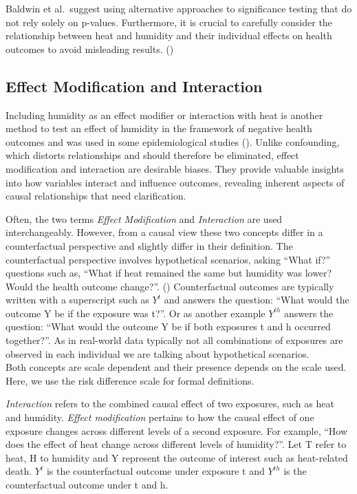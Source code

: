 \documentclass[
]{krantz}
\begin{document}
Baldwin et al.~suggest using alternative approaches to significance testing that do not rely solely on p-values. Furthermore, it is crucial to carefully consider the relationship between heat and humidity and their individual effects on health outcomes to avoid misleading results. (\citet{baldwin2023})

\subsection{Effect Modification and Interaction}\label{effect-modification-and-interaction}

Including humidity as an effect modifier or interaction with heat is another method to test an effect of humidity in the framework of negative health outcomes and was used in some epidemiological studies (\citet{baldwin2023}). Unlike confounding, which distorts relationships and should therefore be eliminated, effect modification and interaction are desirable biases. They provide valuable insights into how variables interact and influence outcomes, revealing inherent aspects of causal relationships that need clarification.

Often, the two terms \emph{Effect Modification} and \emph{Interaction} are used interchangeably. However, from a causal view these two concepts differ in a counterfactual perspective and slightly differ in their definition. The counterfactual perspective involves hypothetical scenarios, asking ``What if?'' questions such as, ``What if heat remained the same but humidity was lower? Would the health outcome change?''. (\citet{bours2021}) Counterfactual outcomes are typically written with a superscript such as \(Y^t\) and answers the question: ``What would the outcome Y be if the exposure was t?''. Or as another example \(Y^{th}\) answers the question: ``What would the outcome Y be if both exposures t and h occurred together?''. As in real-world data typically not all combinations of exposures are observed in each individual we are talking about hypothetical scenarios.\\
Both concepts are scale dependent and their presence depends on the scale used. Here, we use the risk difference scale for formal definitions.

\emph{Interaction} refers to the combined causal effect of two exposures, such as heat and humidity. \emph{Effect modification} pertains to how the causal effect of one exposure changes across different levels of a second exposure. For example, ``How does the effect of heat change across different levels of humidity?''.
Let T refer to heat, H to humidity and Y represent the outcome of interest such as heat-related death. \(Y^t\) is the counterfactual outcome under exposure t and \(Y^{th}\) is the counterfactual outcome under t and h.
\end{document}
